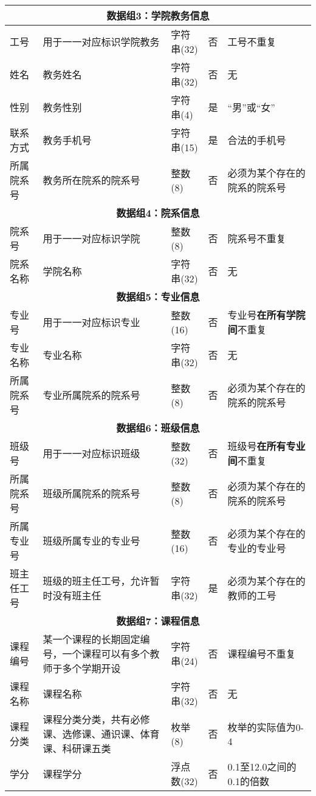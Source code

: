 \begin{center}
\begin{longtable}{p{6em}p{16em}p{8em}@{}p{2em}p{16em}}
        \multicolumn{5}{c}{\textbf{数据组3：学院教务信息}} \\
        \midrule
        工号 & 用于一一对应标识学院教务 & 字符串(32) & 否 & 工号不重复 \\   
        姓名 & 教务姓名 & 字符串(32) & 否 & 无 \\
        性别 & 教务性别 & 字符串(4) & 是 & “男”或“女” \\
        联系方式 & 教务手机号 & 字符串(15) & 是 & 合法的手机号 \\
        所属院系号 & 教务所在院系的院系号 & 整数(8) & 否 & 必须为某个存在的院系的院系号 \\
        \midrule

        \multicolumn{5}{c}{\textbf{数据组4：院系信息}} \\
        \midrule
        院系号 & 用于一一对应标识学院 & 整数(8) & 否 & 院系号不重复 \\
        院系名称 & 学院名称 & 字符串(32) & 否 & 无 \\
        \midrule

        \multicolumn{5}{c}{\textbf{数据组5：专业信息}} \\
        \midrule
        专业号 & 用于一一对应标识专业 & 整数(16) & 否 & 专业号\textbf{在所有学院间}不重复 \\
        专业名称 & 专业名称 & 字符串(32) & 否 & 无 \\
        所属院系号 & 专业所属院系的院系号 & 整数(8) & 否 & 必须为某个存在的院系的院系号 \\
        \midrule

        \multicolumn{5}{c}{\textbf{数据组6：班级信息}} \\
        \midrule
        班级号 & 用于一一对应标识班级 & 整数(32) & 否 & 班级号\textbf{在所有专业间}不重复 \\
        所属院系号 & 班级所属院系的院系号 & 整数(8) & 否 & 必须为某个存在的院系的院系号 \\
        所属专业号 & 班级所属专业的专业号 & 整数(16) & 否 & 必须为某个存在的专业的专业号 \\
        班主任工号 & 班级的班主任工号，允许暂时没有班主任 & 字符串(32) & 是 & 必须为某个存在的教师的工号 \\
        \midrule

        \multicolumn{5}{c}{\textbf{数据组7：课程信息}} \\
        \midrule
        课程编号 & 某一个课程的长期固定编号，一个课程可以有多个教师于多个学期开设 & 字符串(24) & 否 & 课程编号不重复 \\
        课程名称 & 课程名称 & 字符串(32) & 否 & 无 \\
        课程分类 & 课程分类分类，共有必修课、选修课、通识课、体育课、科研课五类 & 枚举(8) & 否 & 枚举的实际值为0-4 \\
        学分 & 课程学分 & 浮点数(32) & 否 & 0.1至12.0之间的0.1的倍数 \\
        \midrule


\end{longtable}
\end{center}
